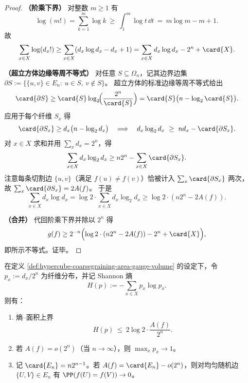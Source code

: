 \begin{proof}
\textbf{（阶乘下界）}
对整数 \(m\ge 1\) 有
\[
\log(m!)=\sum_{k=1}^{m}\log k\ \ge\ \int_{1}^{m}\log t\,\dd t\ =\ m\log m-m+1.
\]
故
\[
\sum_{x\in X}\log(d_x!)
\ge
\sum_{x\in X}(d_x\log d_x-d_x+1)
=
\sum_{x\in X}d_x\log d_x-2^n+\card{X}.
\]

\textbf{（超立方体边缘等周不等式）}
对任意 \(S\subseteq \Omega_n\)，记其边界边集
\(
\partial S:=\{\{u,v\}\in E_n:\ u\in S,\ v\notin S\}
\)。
超立方体的标准边缘等周不等式给出
\[
\card{\partial S}
\ge
\card{S}\log_2\!\Bigl(\frac{2^n}{\card{S}}\Bigr)
=
\card{S}\bigl(n-\log_2\card{S}\bigr).
\]
应用于每个纤维 \(S_x\) 得
\[
\card{\partial S_x}\ge d_x\bigl(n-\log_2 d_x\bigr)
\quad\Longrightarrow\quad
d_x\log_2 d_x\ \ge\ nd_x-\card{\partial S_x}.
\]
对 \(x\in X\) 求和并用 \(\sum_x d_x=2^n\)，得
\[
\sum_{x\in X}d_x\log_2 d_x
\ge
n2^n-\sum_{x\in X}\card{\partial S_x}.
\]
注意每条切割边 \(\{u,v\}\)（满足 \(f(u)\neq f(v)\)）恰被计入 \(\sum_x\card{\partial S_x}\) 两次，故 \(\sum_x\card{\partial S_x}=2A(f)\)。
于是
\[
\sum_{x\in X}d_x\log d_x
=
\log 2\cdot \sum_{x\in X}d_x\log_2 d_x
\ge
\log 2\cdot (n2^n-2A(f)).
\]

\textbf{（合并）}
代回阶乘下界并除以 \(2^n\) 得
\[
g(f)
\ge
2^{-n}\Bigl(\log 2\cdot (n2^n-2A(f))-2^n+\card{X}\Bigr),
\]
即所示不等式。证毕。
\end{proof}



\begin{proposition}[面积律的熵上界与二相刚性]\label{prop:hypercube-entropy-area-rigidity}
在定义 \ref{def:hypercube-coarsegraining-area-gauge-volume} 的设定下，令 \(p_x:=d_x/2^n\) 为纤维分布，并记 Shannon 熵
\[
H(p):=-\sum_{x\in X}p_x\log p_x.
\]
则有：
\begin{enumerate}
  \item \label{it:hypercube-entropy-area} 熵--面积上界
  \[
  \boxed{\;
  H(p)\ \le\ 2\log 2\cdot \frac{A(f)}{2^n}.
  \;}
  \]
  \item \label{it:hypercube-area-collapse} 若 \(A(f)=o(2^n)\)（当 \(n\to\infty\)），则 \(\max_x p_x\to 1\)。
  \item \label{it:hypercube-area-saturation} 记 \(\card{E_n}=n2^{n-1}\)。若 \(A(f)=\card{E_n}-o(2^n)\)，则对均匀随机边 \(\{U,V\}\in E_n\) 有 \(\PP(f(U)=f(V))\to 0\)。
\end{enumerate}
\end{proposition}

